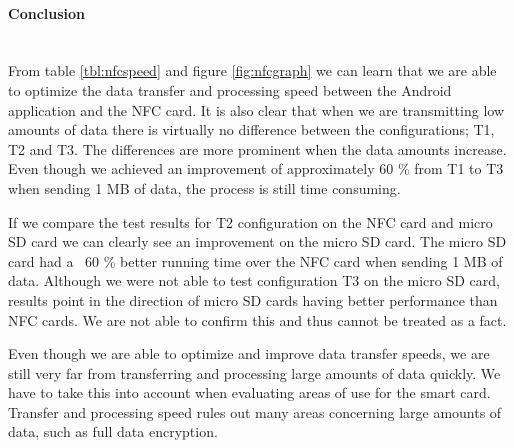 \paragraph{Conclusion}\mbox{}\\
From table \ref{tbl:nfcspeed} and figure \ref{fig:nfcgraph} we can learn that we are able to optimize the data transfer and processing speed between the Android application and the NFC card. It is also clear that when we are transmitting low amounts of data there is virtually no difference between the configurations; T1, T2 and T3. The differences are more prominent when the data amounts increase. Even though we achieved an improvement of approximately 60 \% from T1 to T3 when sending 1 MB of data, the process is still time consuming.

If we compare the test results for T2 configuration on the NFC card and micro SD card we can clearly see an improvement on the micro SD card. The micro SD card had a ~60 \%  better running time over the NFC card when sending 1 MB of data. Although we were not able to test configuration T3 on the micro SD card, results point in the direction of micro SD cards having better performance than NFC cards. We are not able to confirm this and thus cannot be treated as a fact.

Even though we are able to optimize and improve data transfer speeds, we are still very far from transferring and processing large amounts of data quickly. We have to take this into account when evaluating areas of use for the smart card. Transfer and processing speed rules out many areas concerning large amounts of data, such as full data encryption.
